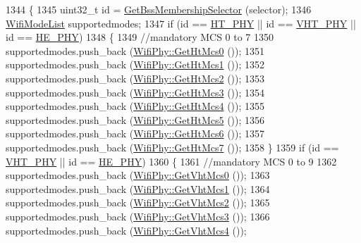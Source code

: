 \begin{DoxyCode}
1344 \{
1345   uint32\_t \textcolor{keywordtype}{id} = \hyperlink{classns3_1_1WifiPhy_a3b6817c0140f083292ef70333d1c78c3}{GetBssMembershipSelector} (selector);
1346   \hyperlink{namespacens3_abceecb3f813d2b4af697068f25085024}{WifiModeList} supportedmodes;
1347   \textcolor{keywordflow}{if} (\textcolor{keywordtype}{id} == \hyperlink{wifi-phy_8h_aa14582218f55eb2528494e9d2da6da5e}{HT\_PHY} || \textcolor{keywordtype}{id} == \hyperlink{wifi-phy_8h_aa9033bc77b3ccafb06e343442bf31e13}{VHT\_PHY} || \textcolor{keywordtype}{id} == \hyperlink{wifi-phy_8h_a4d8ba0c6033ee667a5145799b36facec}{HE\_PHY})
1348     \{
1349       \textcolor{comment}{//mandatory MCS 0 to 7}
1350       supportedmodes.push\_back (\hyperlink{classns3_1_1WifiPhy_afd7d25645f977d407384cdee4ba1a425}{WifiPhy::GetHtMcs0} ());
1351       supportedmodes.push\_back (\hyperlink{classns3_1_1WifiPhy_ab17e9ac1131bb983ad72a67e62918717}{WifiPhy::GetHtMcs1} ());
1352       supportedmodes.push\_back (\hyperlink{classns3_1_1WifiPhy_a45ce3c7c5066f396c951b1b0f2a7cb7c}{WifiPhy::GetHtMcs2} ());
1353       supportedmodes.push\_back (\hyperlink{classns3_1_1WifiPhy_a12c0870df456b9074d5e20f9201ee506}{WifiPhy::GetHtMcs3} ());
1354       supportedmodes.push\_back (\hyperlink{classns3_1_1WifiPhy_a44ec96f5f0c585ae31054a40b1a7f829}{WifiPhy::GetHtMcs4} ());
1355       supportedmodes.push\_back (\hyperlink{classns3_1_1WifiPhy_a9bc64faa10ab2e9046c79976d886739d}{WifiPhy::GetHtMcs5} ());
1356       supportedmodes.push\_back (\hyperlink{classns3_1_1WifiPhy_a0535d12661f98a538148e1d8780251ba}{WifiPhy::GetHtMcs6} ());
1357       supportedmodes.push\_back (\hyperlink{classns3_1_1WifiPhy_adb84f2cae1e6dab06e49f6ef215c0a7e}{WifiPhy::GetHtMcs7} ());
1358     \}
1359   \textcolor{keywordflow}{if} (\textcolor{keywordtype}{id} == \hyperlink{wifi-phy_8h_aa9033bc77b3ccafb06e343442bf31e13}{VHT\_PHY} || \textcolor{keywordtype}{id} == \hyperlink{wifi-phy_8h_a4d8ba0c6033ee667a5145799b36facec}{HE\_PHY})
1360     \{
1361       \textcolor{comment}{//mandatory MCS 0 to 9}
1362       supportedmodes.push\_back (\hyperlink{classns3_1_1WifiPhy_a0abd27d8c214424a39ea9ea3ac207772}{WifiPhy::GetVhtMcs0} ());
1363       supportedmodes.push\_back (\hyperlink{classns3_1_1WifiPhy_ae2059a293baf661fc58cf72dc22db394}{WifiPhy::GetVhtMcs1} ());
1364       supportedmodes.push\_back (\hyperlink{classns3_1_1WifiPhy_aed23b5bd82ba4cb62eb0d594d02accbe}{WifiPhy::GetVhtMcs2} ());
1365       supportedmodes.push\_back (\hyperlink{classns3_1_1WifiPhy_a9cfb02d62871a811cbc6d0133f1417fb}{WifiPhy::GetVhtMcs3} ());
1366       supportedmodes.push\_back (\hyperlink{classns3_1_1WifiPhy_a6b92afa4613c7f876f494d6f295b5135}{WifiPhy::GetVhtMcs4} ());

\end{DoxyCode}
